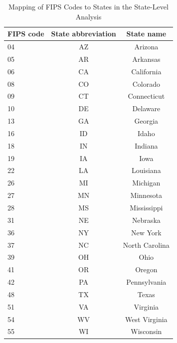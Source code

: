 







\begin{table}[htbp]
\centering
\caption{Mapping of FIPS Codes to States in the State-Level Analysis}
\label{tab:state_fips}
\begin{tabular}{lcc}
\toprule
FIPS code & State abbreviation & State name \\
\midrule
04 & AZ & Arizona \\
05 & AR & Arkansas \\
06 & CA & California \\
08 & CO & Colorado \\
09 & CT & Connecticut \\
10 & DE & Delaware \\
13 & GA & Georgia \\
16 & ID & Idaho \\
18 & IN & Indiana \\
19 & IA & Iowa \\
22 & LA & Louisiana \\
26 & MI & Michigan \\
27 & MN & Minnesota \\
28 & MS & Mississippi \\
31 & NE & Nebraska \\
36 & NY & New York \\
37 & NC & North Carolina \\
39 & OH & Ohio \\
41 & OR & Oregon \\
42 & PA & Pennsylvania \\
48 & TX & Texas \\
51 & VA & Virginia \\
54 & WV & West Virginia \\
55 & WI & Wisconsin \\
\bottomrule
\end{tabular}
\end{table}
